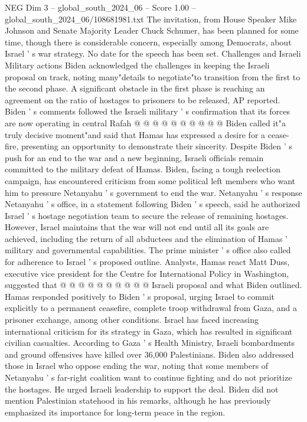 \begin{textsample}{NEG Dim 3 – global\_south\_2024\_06 – Score 1.00 – global\_south\_2024\_06/108681981.txt}
The invitation, from House Speaker Mike Johnson and Senate Majority Leader Chuck Schumer, has been planned for some time, though there is considerable concern, especially among Democrats, about Israel ' s war strategy.
No date for the speech has been set.
Challenges and Israeli Military actions Biden acknowledged the challenges in keeping the Israeli proposal on track, noting many"details to negotiate"to transition from the first to the second phase.
A significant obstacle in the first phase is reaching an agreement on the ratio of hostages to prisoners to be released, AP reported.
Biden ' s comments followed the Israeli military ' s confirmation that its forces are now operating in central Rafah @ @ @ @ @ @ @ @ @ @ Biden called it"a truly decisive moment"and said that Hamas has expressed a desire for a cease-fire, presenting an opportunity to demonstrate their sincerity.
Despite Biden ' s push for an end to the war and a new beginning, Israeli officials remain committed to the military defeat of Hamas.
Biden, facing a tough reelection campaign, has encountered criticism from some political left members who want him to pressure Netanyahu ' s government to end the war.
Netanyahu ' s response Netanyahu ' s office, in a statement following Biden ' s speech, said he authorized Israel ' s hostage negotiation team to secure the release of remaining hostages.
However, Israel maintains that the war will not end until all its goals are achieved, including the return of all abductees and the elimination of Hamas ' military and governmental capabilities.
The prime minister ' s office also called for adherence to Israel ' s proposed outline.
Analysts, Hamas react Matt Duss, executive vice president for the Centre for International Policy in Washington, suggested that @ @ @ @ @ @ @ @ @ @ Israeli proposal and what Biden outlined.
Hamas responded positively to Biden ' s proposal, urging Israel to commit explicitly to a permanent ceasefire, complete troop withdrawal from Gaza, and a prisoner exchange, among other conditions.
Israel has faced increasing international criticism for its strategy in Gaza, which has resulted in significant civilian casualties.
According to Gaza ' s Health Ministry, Israeli bombardments and ground offensives have killed over 36,000 Palestinians.
Biden also addressed those in Israel who oppose ending the war, noting that some members of Netanyahu ' s far-right coalition want to continue fighting and do not prioritize the hostages.
He urged Israeli leadership to support the deal.
Biden did not mention Palestinian statehood in his remarks, although he has previously emphasized its importance for long-term peace in the region.

\end{textsample}
